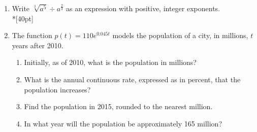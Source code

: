 \documentclass[12pt, oneside]{article}
\begin{document}
\begin{enumerate}
\item Write $\sqrt[3]{a^5} \div a^{\frac{2}{3}}$ as an expression with positive, integer exponents.\\*[40pt]
    \begin{flushright}[3]\end{flushright}

\item The function $p(t)=110e^{0.045t}$ models the population of a city, in millions, $t$ years after 2010.
\begin{enumerate}
    \item Initially, as of 2010, what is the population in millions?%
        \begin{flushright}[1]\end{flushright}
    \item What is the annual continuous rate, expressed as in percent, that the population increases?%
        \begin{flushright}[1]\end{flushright}
    \item Find the population in 2015, rounded to the nearest million.\\[60pt]
        \begin{flushright}[2]\end{flushright}
    \item In what year will the population be approximately 165 million?
        \begin{flushright}[2]\end{flushright}
\end{enumerate}



\end{enumerate}
\end{document}
